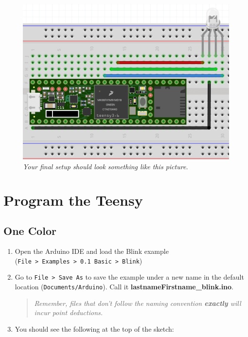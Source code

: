 \documentclass[]{book}
\begin{document}
\begin{figure}
\centering
\includegraphics{images/breadboard_led_teensy.png}
\caption{\emph{Your final setup should look something like this picture.}}
\end{figure}

\hypertarget{program-the-teensy}{%
\section{Program the Teensy}\label{program-the-teensy}}

\hypertarget{one-color}{%
\subsection{One Color}\label{one-color}}

\begin{enumerate}
\def\labelenumi{\arabic{enumi}.}
\item
  Open the Arduino IDE and load the Blink example (\texttt{File\ \textgreater{}\ Examples\ \textgreater{}\ 0.1\ Basic\ \textgreater{}\ Blink})
\item
  Go to \texttt{File\ \textgreater{}\ Save\ As} to save the example under a new name in the default location (\texttt{Documents/Arduino}). Call it \textbf{lastnameFirstname\_blink.ino}.

  \begin{quote}
  \emph{Remember, files that don't follow the naming convention \textbf{exactly} will incur point deductions.}
  \end{quote}
\item
  You should see the following at the top of the sketch:
\end{enumerate}
\end{document}

